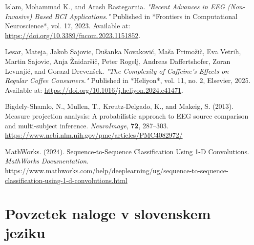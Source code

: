 \documentclass[12pt,a4paper,titlepage,openany]{report}
\begin{document}
\begin{thebibliography}{99}
     Islam, Mohammad K., and Arash Rastegarnia. 
     \emph{"Recent Advances in EEG (Non-Invasive) Based BCI Applications."} 
     Published in *Frontiers in Computational Neuroscience*, vol. 17, 2023. Available at: \url{https://doi.org/10.3389/fncom.2023.1151852}.

     Lesar, Mateja, Jakob Sajovic, Dušanka Novaković, Maša Primožič, Eva Vetrih, Martin Sajovic, Anja Žnidaršič, Peter Rogelj, Andreas Daffertshofer, Zoran Levnajić, and Gorazd Drevenšek.  
     \emph{"The Complexity of Caffeine's Effects on Regular Coffee Consumers."}  
     Published in *Heliyon*, vol. 11, no. 2, Elsevier, 2025. Available at: \url{https://doi.org/10.1016/j.heliyon.2024.e41471}.

    Bigdely-Shamlo, N., Mullen, T., Kreutz-Delgado, K., and Makeig, S. (2013).
    Measure projection analysis: A probabilistic approach to EEG source comparison and multi-subject inference.
    \textit{NeuroImage}, \textbf{72}, 287--303.
    \url{https://www.ncbi.nlm.nih.gov/pmc/articles/PMC4082972/}

    MathWorks. (2024).
    Sequence-to-Sequence Classification Using 1-D Convolutions.
    \textit{MathWorks Documentation}.
    \url{https://www.mathworks.com/help/deeplearning/ug/sequence-to-sequence-classification-using-1-d-convolutions.html}

    
     
\end{thebibliography}
\newpage


\chapter{Povzetek naloge v slovenskem jeziku}
\thispagestyle{fancy}
\end{document}
